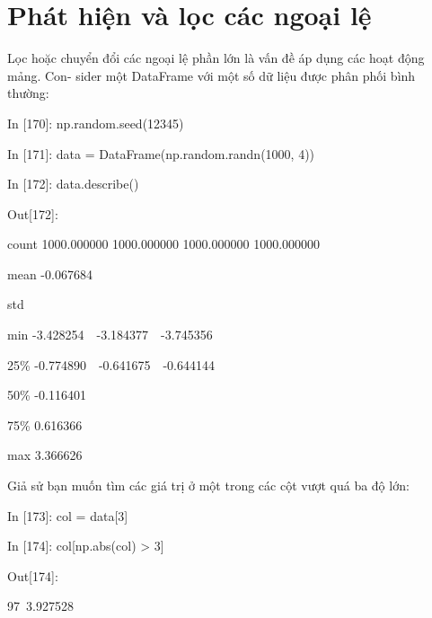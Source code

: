 \section{Phát hiện và lọc các ngoại lệ}
Lọc hoặc chuyển đổi các ngoại lệ phần lớn là vấn đề áp dụng các hoạt động mảng. Con- sider một DataFrame với một số dữ liệu được phân phối bình thường:\par
    \quad\textup{In [170]: np.random.seed(12345)  }\par
    \quad\textup{In [171]: data = DataFrame(np.random.randn(1000, 4)) }\par
    \quad\textup{In [172]: data.describe()  }\par 
    \quad\textup{Out[172]: }\par
    \quad\textup{\quad\quad\quad{}\quad\quad\quad\quad{}  \quad\quad\quad\quad{} \quad\quad\quad\quad{} }\par
    \quad\textup{count  1000.000000  1000.000000  1000.000000  1000.000000}\par
    \quad\textup{mean     -0.067684 \quad{}\quad{} }\par
    \quad\textup{std\quad{}\quad{}\quad{} }\par
    \quad\textup{min      -3.428254\quad{}\quad\ \     -3.184377\quad\ \     -3.745356  }\par
    \quad\textup{25\%      -0.774890\quad{}\quad\ \    -0.641675\quad\ \     -0.644144 }\par
    \quad\textup{50\%      -0.116401\quad{}\quad{}\quad{}  }\par
    \quad\textup{75\%       0.616366 \quad{}\quad{}\quad{} }\par
    \quad\textup{max       3.366626 \quad{}\quad{}\quad{} }\par
Giả sử bạn muốn tìm các giá trị ở một trong các cột vượt quá ba độ lớn:\par
    \quad\textup{In [173]: col = data[3]  }\par
    \quad\textup{In [174]: col[np.abs(col) > 3]  }\par
    \quad\textup{Out[174]:  }\par 
    \quad\textup{97\quad \      3.927528 }\par
